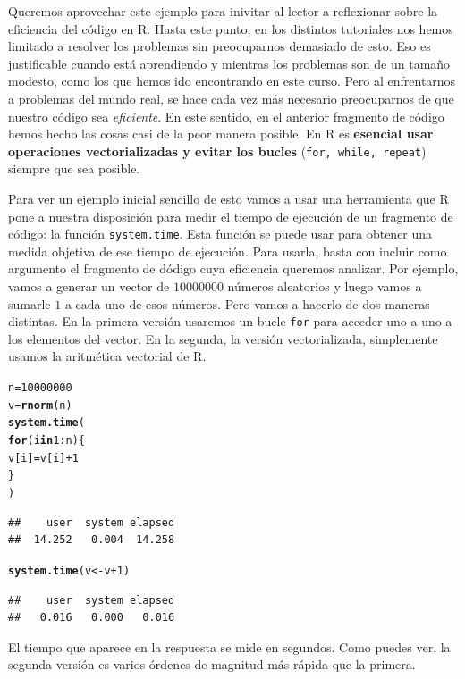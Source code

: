 \documentclass[10pt,a4paper]{article}\usepackage[]{graphicx}\usepackage[]{color}
\makeatletter
\newcommand{\hlnum}[1]{\textcolor[rgb]{0.686,0.059,0.569}{#1}}%
\newcommand{\hlopt}[1]{\textcolor[rgb]{0,0,0}{#1}}%
\newcommand{\hlstd}[1]{\textcolor[rgb]{0.345,0.345,0.345}{#1}}%
\newcommand{\hlkwa}[1]{\textcolor[rgb]{0.161,0.373,0.58}{\textbf{#1}}}%
\newcommand{\hlkwb}[1]{\textcolor[rgb]{0.69,0.353,0.396}{#1}}%
\newcommand{\hlkwd}[1]{\textcolor[rgb]{0.737,0.353,0.396}{\textbf{#1}}}%
\newenvironment{kframe}{%
 \def\at@end@of@kframe{}%
 \ifinner\ifhmode%
  \def\at@end@of@kframe{\end{minipage}}%
  \begin{minipage}{\columnwidth}%
 \fi\fi%
 \def\FrameCommand##1{\hskip\@totalleftmargin \hskip-\fboxsep
 \colorbox{shadecolor}{##1}\hskip-\fboxsep
     \hskip-\linewidth \hskip-\@totalleftmargin \hskip\columnwidth}%
 \MakeFramed {\advance\hsize-\width
   \@totalleftmargin\z@ \linewidth\hsize
   \@setminipage}}%
 {\par\unskip\endMakeFramed%
 \at@end@of@kframe}
\newenvironment{knitrout}{}{} %
\newcounter {cont01}
\makeatother
\begin{document}
Queremos aprovechar este ejemplo para inivitar al lector a reflexionar sobre la eficiencia del código en R. Hasta este punto, en los distintos tutoriales nos hemos limitado a resolver los problemas sin preocuparnos demasiado de esto. Eso es justificable cuando está aprendiendo y mientras los problemas son de un tamaño modesto, como los que hemos ido encontrando en este curso. Pero al enfrentarnos a problemas del mundo real, se hace cada vez más necesario preocuparnos de que nuestro código sea {\em eficiente}. En este sentido, en el anterior fragmento de código hemos hecho las cosas casi de la peor manera posible. En R es {\bf esencial usar operaciones vectorializadas y evitar los bucles} ({\tt for, while, repeat}) siempre que sea posible.

Para ver un ejemplo inicial sencillo de esto vamos a usar una herramienta que R pone a nuestra disposición para medir el tiempo de ejecución de un fragmento de código: la función {\tt system.time}. Esta función se puede usar para obtener una medida objetiva de ese tiempo de ejecución. Para usarla, basta con incluir como argumento el fragmento de dódigo cuya eficiencia queremos analizar. Por ejemplo, vamos a generar un vector de $10000000$ números aleatorios y luego vamos a sumarle $1$ a cada uno de esos números. Pero vamos a hacerlo de dos maneras distintas. En la primera versión usaremos un bucle {\tt for} para acceder uno a uno a los elementos del vector. En la segunda, la versión vectorializada, simplemente usamos la aritmética vectorial de R.
\begin{knitrout}
\color{fgcolor}\begin{kframe}
\begin{alltt}
\hlstd{n} \hlkwb{=} \hlnum{10000000}
\hlstd{v} \hlkwb{=} \hlkwd{rnorm}\hlstd{(n)}
\hlkwd{system.time}\hlstd{(}
  \hlkwa{for} \hlstd{(i} \hlkwa{in} \hlnum{1}\hlopt{:}\hlstd{n)\{}
    \hlstd{v[i]} \hlkwb{=} \hlstd{v[i]} \hlopt{+} \hlnum{1}
  \hlstd{\}}
\hlstd{)}
\end{alltt}
\begin{verbatim}
##    user  system elapsed 
##  14.252   0.004  14.258
\end{verbatim}
\begin{alltt}
\hlkwd{system.time}\hlstd{(v} \hlkwb{<-} \hlstd{v} \hlopt{+}\hlnum{1}\hlstd{)}
\end{alltt}
\begin{verbatim}
##    user  system elapsed 
##   0.016   0.000   0.016
\end{verbatim}
\end{kframe}
\end{knitrout}
El tiempo que aparece en la respuesta se mide en segundos. Como puedes ver, la segunda versión es varios órdenes de magnitud más rápida que la primera.
\end{document}
